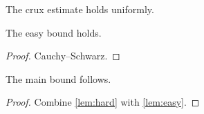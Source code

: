 \documentclass{article}
\begin{document}
\begin{lemma}\label{lem:hard}
The crux estimate holds uniformly.
\end{lemma}

\begin{lemma}\label{lem:easy}
The easy bound holds.
\end{lemma}
\begin{proof}
Cauchy--Schwarz.
\end{proof}

\begin{theorem}\label{thm:goal}
The main bound follows.
\end{theorem}
\begin{proof}
Combine \ref{lem:hard} with \ref{lem:easy}.
\end{proof}
\end{document}

